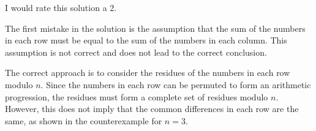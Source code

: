 I would rate this solution a 2.

The first mistake in the solution is the assumption that the sum of the numbers in each row must be equal to the sum of the numbers in each column. This assumption is not correct and does not lead to the correct conclusion.

The correct approach is to consider the residues of the numbers in each row modulo $n$. Since the numbers in each row can be permuted to form an arithmetic progression, the residues must form a complete set of residues modulo $n$. However, this does not imply that the common differences in each row are the same, as shown in the counterexample for $n=3$.
